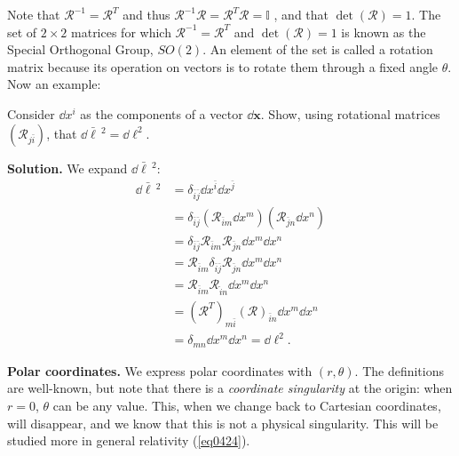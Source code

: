 \documentclass[10pt]{article}
\begin{document}
	Note that $\mathcal{R}^{-1} = \mathcal{R}^{T}$ and thus $\mathcal{R}^{-1}\mathcal{R} = \mathcal{R}^{T}\mathcal{R} = \mathbb{I}$ , and that $\det(\mathcal{R})=1$. The set of $2\times 2$ matrices for which $\mathcal{R}^{-1}=\mathcal{R}^{T}$ and $\det(\mathcal{R})=1$ is known as the Special Orthogonal Group, $SO(2)$. An element of the set is called a rotation matrix because its operation on vectors is to rotate them through a fixed angle $\theta$. Now an example:
	\begin{exercise}
		Consider $\dd x^{i}$ as the components of a vector $\dd \mathbf{x}$. Show, using rotational matrices $(\mathcal{R}_{j \bar{i}})$, that $\dd \bar{\ell}\,^{2} = \dd \ell^{2}$.

		\vspace{1\baselineskip}
		\textbf{Solution.} We expand $\dd \bar{\ell}\, ^{2}$:
		\begin{equation}
		  \begin{aligned}
		  \dd \bar{\ell}\,^{2} &= \delta_{\bar{i}\bar{j}} \dd x^{\bar{i}} \dd x^{\bar{j}} \\
		  &= \delta_{\bar{i}\bar{j}} \left( \mathcal{R}_{\bar{i}m}\dd x^{m} \right)\left( \mathcal{R}_{\bar{j}n}\dd x^{n} \right) \\
		  &= \delta_{\bar{i} \bar{j}} \mathcal{R}_{\bar{i}m}\mathcal{R}_{\bar{j}n}\dd x^{m} \dd x^{n} \\
		  &= \mathcal{R}_{\bar{i}m} \delta_{\bar{i}\bar{j}} \mathcal{R}_{\bar{j}n} \dd x^{m} \dd x^{n} \\
		  &= \mathcal{R}_{\bar{i}m}\mathcal{R}_{\hat{i}n} \dd x^{m} \dd x^{n} \\
		  &= \left( \mathcal{R}^{T} \right)_{m \bar{i}}\left( \mathcal{R} \right)_{\bar{i}n} \dd x^{m} \dd x^{n} \\
		  &= \delta_{mn} \dd x^{m} \dd x^{n} = \dd \ell^{2}.  
		  \end{aligned}
		\end{equation}
	\end{exercise}

	\vspace{1\baselineskip}
	\textbf{Polar coordinates.} We express polar coordinates with $(r,\theta)$. The definitions are well-known, but note that there is a \textit{coordinate singularity} at the origin: when $r=0$, $\theta$ can be any value. This, when we change back to Cartesian coordinates, will disappear, and we know that this is not a physical singularity. This will be studied more in general relativity (\ref{eq0424}). 
\end{document}
